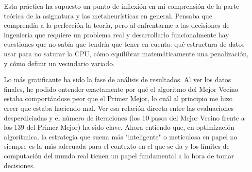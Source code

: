 \documentclass[12pt]{article}
\begin{document}
Esta práctica ha supuesto un punto de inflexión en mi comprensión de la parte teórica de la asignatura y las metaheurísticas en general. Pensaba que comprendía a la perfección la teoría, pero al enfrentarme a las decisiones de ingeniería que requiere un problema real y desarrollarlo funcionalmente hay cuestiones que no sabía que tendría que tener en cuenta: qué estructura de datos usar para no saturar la CPU, cómo equilibrar matemáticamente una penalización, y cómo definir un vecindario variado.

Lo más gratificante ha sido la fase de análisis de resultados. Al ver los datos finales, he podido entender exactamente por qué el algoritmo del Mejor Vecino estaba comportándose peor que el Primer Mejor, lo cuál al principio me hizo creer que estaba haciendo mal. Ver esa relación directa entre las evaluaciones desperdiciadas y el número de iteraciones (los 10 pasos del Mejor Vecino frente a los 139 del Primer Mejor) ha sido clave. Ahora entiendo que, en optimización algorítmica, la estrategia que suena más "inteligente" o meticulosa en papel no siempre es la más adecuada para el contexto en el que se da y los límites de computación del mundo real tienen un papel fundamental a la hora de tomar decisiones.
\end{document}
